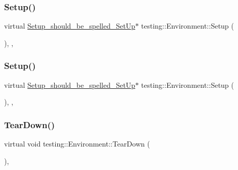 \subsubsection{\texorpdfstring{Setup()}{Setup()}\hspace{0.1cm}{\footnotesize\ttfamily [2/3]}}
{\footnotesize\ttfamily virtual \mbox{\hyperlink{structtesting_1_1_environment_1_1_setup__should__be__spelled___set_up}{Setup\+\_\+should\+\_\+be\+\_\+spelled\+\_\+\+Set\+Up}}$\ast$ testing\+::\+Environment\+::\+Setup (\begin{DoxyParamCaption}{ }\end{DoxyParamCaption})\hspace{0.3cm}{\ttfamily [inline]}, {\ttfamily [private]}, {\ttfamily [virtual]}}

\mbox{\label{classtesting_1_1_environment_a6096a69b03f6eb727a69a39f854cc87b}} 
\subsubsection{\texorpdfstring{Setup()}{Setup()}\hspace{0.1cm}{\footnotesize\ttfamily [3/3]}}
{\footnotesize\ttfamily virtual \mbox{\hyperlink{structtesting_1_1_environment_1_1_setup__should__be__spelled___set_up}{Setup\+\_\+should\+\_\+be\+\_\+spelled\+\_\+\+Set\+Up}}$\ast$ testing\+::\+Environment\+::\+Setup (\begin{DoxyParamCaption}{ }\end{DoxyParamCaption})\hspace{0.3cm}{\ttfamily [inline]}, {\ttfamily [private]}, {\ttfamily [virtual]}}

\mbox{\label{classtesting_1_1_environment_a039bdaa705c46b9b88234cf4d3bb6254}} 
\subsubsection{\texorpdfstring{TearDown()}{TearDown()}\hspace{0.1cm}{\footnotesize\ttfamily [1/3]}}
{\footnotesize\ttfamily virtual void testing\+::\+Environment\+::\+Tear\+Down (\begin{DoxyParamCaption}{ }\end{DoxyParamCaption})\hspace{0.3cm}{\ttfamily [inline]}, {\ttfamily [virtual]}}



